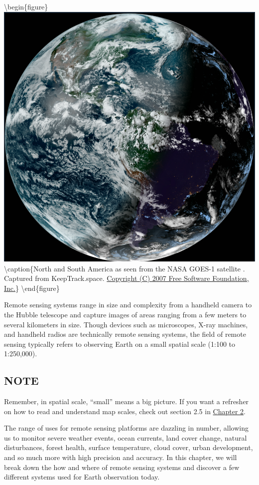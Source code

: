 \documentclass[
]{book}
\begin{document}
\textbackslash begin\{figure\}
\includegraphics[width=0.9\linewidth]{images/12-GOES_1_earth} \textbackslash caption\{North and South America as seen from the NASA GOES-1 satellite \citep{nasa_goes-1_nodate}. Captured from KeepTrack.space. \href{https://fsf.org/}{Copyright (C) 2007 Free Software Foundation, Inc.}\}\label{fig:12-GOES-1-earth}
\textbackslash end\{figure\}

Remote sensing systems range in size and complexity from a handheld camera to the Hubble telescope and capture images of areas ranging from a few meters to several kilometers in size. Though devices such as microscopes, X-ray machines, and handheld radios are technically remote sensing systems, the field of remote sensing typically refers to observing Earth on a small spatial scale (1:100 to 1:250,000).

\hypertarget{note}{%
\subsection*{NOTE}\label{note}}

Remember, in spatial scale, ``small'' means a big picture. If you want a refresher on how to read and understand map scales, check out section 2.5 in \href{https://ubc-geomatics-textbook.github.io/geomatics-textbook/mapping-data.html}{Chapter 2}.

The range of uses for remote sensing platforms are dazzling in number, allowing us to monitor severe weather events, ocean currents, land cover change, natural disturbances, forest health, surface temperature, cloud cover, urban development, and so much more with high precision and accuracy. In this chapter, we will break down the how and where of remote sensing systems and discover a few different systems used for Earth observation today.
\end{document}
